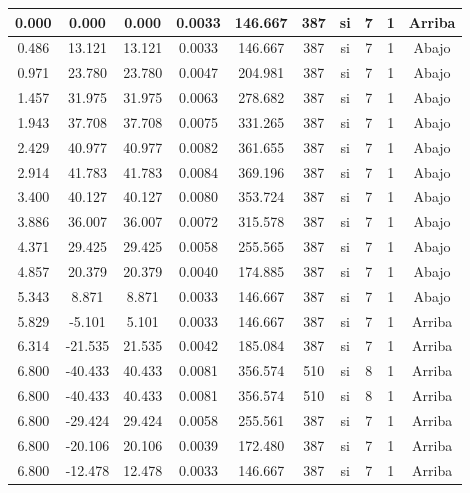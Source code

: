 \begin{table}[H]
{\begin{tabular}{|c|c|c|c|c|c|c|c|c|c|}
        \hline
    0.000 & 0.000 & 0.000 & 0.0033 & 146.667 & 387 & si  & 7   & 1   & Arriba \bigstrut\\
    \hline
    0.486 & 13.121 & 13.121 & 0.0033 & 146.667 & 387 & si  & 7   & 1   & Abajo \bigstrut\\
    \hline
    0.971 & 23.780 & 23.780 & 0.0047 & 204.981 & 387 & si  & 7   & 1   & Abajo \bigstrut\\
    \hline
    1.457 & 31.975 & 31.975 & 0.0063 & 278.682 & 387 & si  & 7   & 1   & Abajo \bigstrut\\
    \hline
    1.943 & 37.708 & 37.708 & 0.0075 & 331.265 & 387 & si  & 7   & 1   & Abajo \bigstrut\\
    \hline
    2.429 & 40.977 & 40.977 & 0.0082 & 361.655 & 387 & si  & 7   & 1   & Abajo \bigstrut\\
    \hline
    2.914 & 41.783 & 41.783 & 0.0084 & 369.196 & 387 & si  & 7   & 1   & Abajo \bigstrut\\
    \hline
    3.400 & 40.127 & 40.127 & 0.0080 & 353.724 & 387 & si  & 7   & 1   & Abajo \bigstrut\\
    \hline
    3.886 & 36.007 & 36.007 & 0.0072 & 315.578 & 387 & si  & 7   & 1   & Abajo \bigstrut\\
    \hline
    4.371 & 29.425 & 29.425 & 0.0058 & 255.565 & 387 & si  & 7   & 1   & Abajo \bigstrut\\
    \hline
    4.857 & 20.379 & 20.379 & 0.0040 & 174.885 & 387 & si  & 7   & 1   & Abajo \bigstrut\\
    \hline
    5.343 & 8.871 & 8.871 & 0.0033 & 146.667 & 387 & si  & 7   & 1   & Abajo \bigstrut\\
    \hline
    5.829 & -5.101 & 5.101 & 0.0033 & 146.667 & 387 & si  & 7   & 1   & Arriba \bigstrut\\
    \hline
    6.314 & -21.535 & 21.535 & 0.0042 & 185.084 & 387 & si  & 7   & 1   & Arriba \bigstrut\\
    \hline
    6.800 & -40.433 & 40.433 & 0.0081 & 356.574 & 510 & si  & 8   & 1   & Arriba \bigstrut\\
    \hline
    6.800 & -40.433 & 40.433 & 0.0081 & 356.574 & 510 & si  & 8   & 1   & Arriba \bigstrut\\
    \hline
    6.800 & -29.424 & 29.424 & 0.0058 & 255.561 & 387 & si  & 7   & 1   & Arriba \bigstrut\\
    \hline
    6.800 & -20.106 & 20.106 & 0.0039 & 172.480 & 387 & si  & 7   & 1   & Arriba \bigstrut\\
    \hline
    6.800 & -12.478 & 12.478 & 0.0033 & 146.667 & 387 & si  & 7   & 1   & Arriba \bigstrut\\

\end{tabular}}
\end{table}
